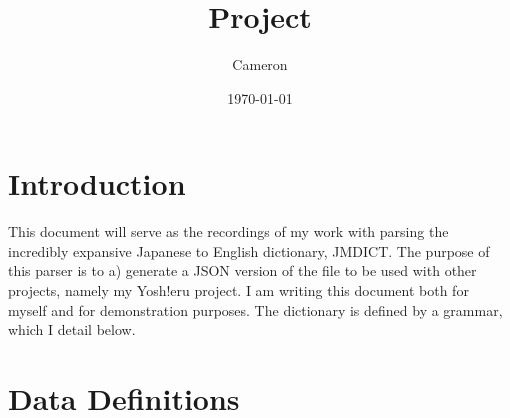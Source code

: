\documentclass[11pt]{article}
\author{Cameron}
\date{\today}
\title{Project}
\begin{document}
\maketitle
\tableofcontents

\section{Introduction}
\label{sec-1}

This document will serve as the recordings of my work with parsing the incredibly expansive Japanese to English
dictionary, JMDICT. The purpose of this parser is to a) generate a JSON version of the file to be used with other
projects, namely my Yosh!eru project. I am writing this document both for myself and for demonstration purposes. The
dictionary is defined by a grammar, which I detail below.

\section{Data Definitions}
\label{sec-2}
\end{document}
